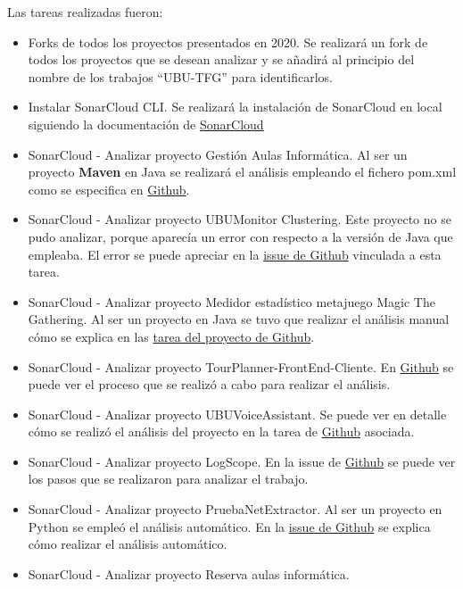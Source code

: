 Las tareas realizadas fueron:
\begin{itemize}
	\item Forks de todos los proyectos presentados en 2020.
		Se realizará un fork de todos los proyectos que se desean analizar y se añadirá al principio del nombre de los trabajos ``UBU-TFG'' para identificarlos. 
	\item Instalar SonarCloud CLI.
		Se realizará la instalación de SonarCloud en local siguiendo la documentación de \href{https://sonarcloud.io/documentation/analysis/scan/sonarscanner/}{SonarCloud} 
	\item SonarCloud - Analizar proyecto Gestión Aulas Informática. 
		Al ser un proyecto \textbf{Maven} en Java se realizará el análisis empleando el fichero pom.xml como se especifica en \href{https://github.com/dbo1001/Gestor-TFG-2021/issues/70}{Github}. 
	\item SonarCloud - Analizar proyecto UBUMonitor Clustering.  
		Este proyecto no se pudo analizar, porque aparecía un error con respecto a la versión de Java que empleaba. El error se puede apreciar en la \href{https://github.com/dbo1001/Gestor-TFG-2021/issues/72}{issue de Github} vinculada a esta tarea. 
	\item SonarCloud - Analizar proyecto Medidor estadístico metajuego Magic The Gathering.  
		Al ser un proyecto en Java se tuvo que realizar el análisis manual cómo se explica en las \href{https://github.com/dbo1001/Gestor-TFG-2021/issues/71}{tarea del proyecto de Github}.
	\item SonarCloud - Analizar proyecto TourPlanner-FrontEnd-Cliente.  
		En \href{https://github.com/dbo1001/Gestor-TFG-2021/issues/74}{Github} se puede ver el proceso que se realizó a cabo para realizar el análisis.
	\item SonarCloud - Analizar proyecto UBUVoiceAssistant. 
		Se puede ver en detalle cómo se realizó el análisis del proyecto en la tarea de \href{https://github.com/dbo1001/Gestor-TFG-2021/issues/76}{Github} asociada.
	\item SonarCloud - Analizar proyecto LogScope. 
		En la issue de \href{https://github.com/dbo1001/Gestor-TFG-2021/issues/75}{Github} se puede ver los pasos que se realizaron para analizar el trabajo.
	\item SonarCloud - Analizar proyecto PruebaNetExtractor. 
		Al ser un proyecto en Python se empleó el análisis automático. En la \href{https://github.com/dbo1001/Gestor-TFG-2021/issues/79}{issue de Github} se explica cómo realizar el análisis automático.
	\item SonarCloud - Analizar proyecto Reserva aulas informática. 

\end{itemize}
